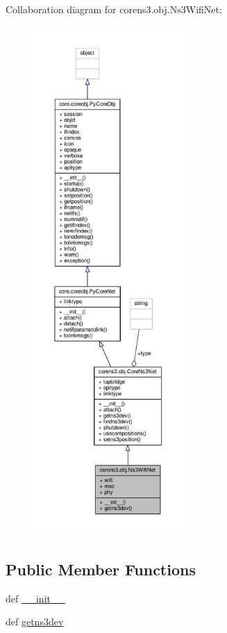 Collaboration diagram for corens3.\+obj.\+Ns3\+Wifi\+Net\+:
\nopagebreak
\begin{figure}[H]
\begin{center}
\leavevmode
\includegraphics[height=550pt]{classcorens3_1_1obj_1_1_ns3_wifi_net__coll__graph}
\end{center}
\end{figure}
\subsection*{Public Member Functions}
\begin{DoxyCompactItemize}
\item 
def \hyperlink{classcorens3_1_1obj_1_1_ns3_wifi_net_a8e36e681d326dd2553b7f8c7ca7c7523}{\+\_\+\+\_\+init\+\_\+\+\_\+}
\item 
def \hyperlink{classcorens3_1_1obj_1_1_ns3_wifi_net_aaa31ce2a55e6b59c15a621fa9cf6fd52}{getns3dev}
\end{DoxyCompactItemize}
